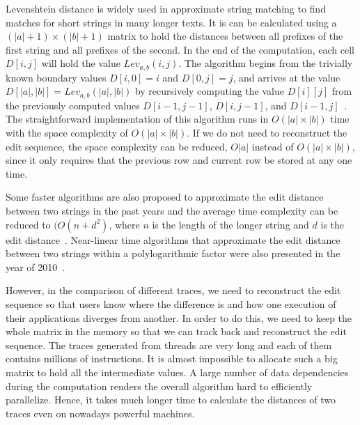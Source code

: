 \documentclass[10pt,journal,cspaper,compsoc]{IEEEtran}
\begin{document}
Levenshtein distance is widely used in approximate string matching
to find matches for short strings in many longer texts. It is can be
calculated using a $(|a| + 1)\times (|b|+1)$  matrix to hold the
distances between all prefixes of the first string and all prefixes
of the second. In the end of the computation, each cell $D[i,j]$
will hold the value $Lev_{a,b}(i,j)$. The algorithm begins from the
trivially known boundary values $D[i,0]=i$ and $D[0,j]=j$, and
arrives at the value $D[|a|,|b|]=Lev_{a,b}(|a|,|b|)$ by recursively
computing the value $D[i][j]$ from the previously computed values
$D[i-1,j-1]$, $D[i,j-1]$, and $D[i-1,j]$~\cite{bit03}. The
straightforward implementation of this algorithm runs in
$O(|a|\times |b|)$ time with the space complexity of $O(|a|\times
|b|)$. If we do not need to reconstruct the edit sequence, the space
complexity can be reduced, $O|a|$ instead of $O(|a|\times |b|)$,
since it only requires that the previous row and current row be
stored at any one time.

Some faster algorithms are also proposed to approximate the edit
distance between two strings in the past years and the average time
complexity can be reduced to $(O(n+d^2)$, where $n$ is the length of
the longer string and $d$ is the edit distance~\cite{ld1996}.
Near-linear time algorithms that approximate the edit distance
between two strings within a polylogarithmic factor were also
presented in the year of 2010~\cite{ld2010}.

However, in the comparison of different traces, we need to
reconstruct the edit sequence so that users know where the
difference is and how one execution of their applications diverges
from another. In order to do this, we need to keep the whole matrix
in the memory so that we can track back and reconstruct the edit
sequence. The traces generated from threads are very long and each
of them contains millions of instructions. It is almost impossible
to allocate such a big matrix to hold all the intermediate values. A
large number of data dependencies during the computation renders the
overall algorithm hard to efficiently parallelize. Hence, it takes
much longer time to calculate the distances of two traces even on
nowadays powerful machines.
\end{document}

